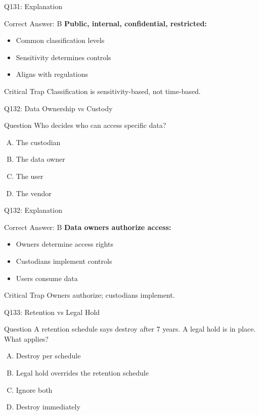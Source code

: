 \documentclass{beamer}
\begin{document}
	\begin{frame}{Q131: Explanation}
		\begin{block}{Correct Answer: B}
			\textbf{Public, internal, confidential, restricted:}
			\begin{itemize}
				\item Common classification levels
				\item Sensitivity determines controls
				\item Aligns with regulations
			\end{itemize}
		\end{block}
		\begin{alertblock}{Critical Trap}
			Classification is sensitivity-based, not time-based.
		\end{alertblock}
	\end{frame}
	
	\begin{frame}{Q132: Data Ownership vs Custody}
		\begin{block}{Question}
			Who decides who can access specific data?
		\end{block}
		\begin{enumerate}[(A)]
			\item The custodian
			\item The data owner
			\item The user
			\item The vendor
		\end{enumerate}
	\end{frame}
	
	\begin{frame}{Q132: Explanation}
		\begin{block}{Correct Answer: B}
			\textbf{Data owners authorize access:}
			\begin{itemize}
				\item Owners determine access rights
				\item Custodians implement controls
				\item Users consume data
			\end{itemize}
		\end{block}
		\begin{alertblock}{Critical Trap}
			Owners authorize; custodians implement.
		\end{alertblock}
	\end{frame}
	
	\begin{frame}{Q133: Retention vs Legal Hold}
		\begin{block}{Question}
			A retention schedule says destroy after 7 years. A legal hold is in place. What applies?
		\end{block}
		\begin{enumerate}[(A)]
			\item Destroy per schedule
			\item Legal hold overrides the retention schedule
			\item Ignore both
			\item Destroy immediately
		\end{enumerate}
	\end{frame}
	
\end{document}
